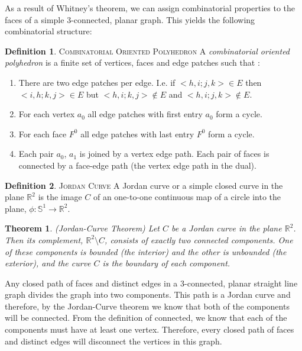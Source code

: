\documentclass[11pt]{article}
\newcommand{\R}{\mathbb{R}}
\newtheorem{theorem}{Theorem}[section]
\theoremstyle{definition}
\newtheorem{definition}{Definition}[section]
\begin{document}
	As a result of Whitney's theorem, we can assign combinatorial properties to the faces of a simple 3-connected, planar graph. 
	This yields the following combinatorial structure:
	\theoremstyle{definition}
	\begin{definition}{\textsc{Combinatorial Oriented Polyhedron}}
		A \emph{combinatorial oriented polyhedron} is a finite set of vertices, faces and edge patches such that \cite{mccProof}:
		\begin{enumerate}
			\item There are two edge patches per edge. I.e. if $<h,i;j,k> \in E$ then $<i,h;k,j> \in E$ but $<h,i;k,j> \not\in E$ and $<h,i;j,k> \not\in E$.
			\item For each vertex $a_0$ all edge patches with first entry $a_0$ form a cycle. 
			\item For each face $F^0$ all edge patches with last entry $F^0$ form a cycle.
			\item Each pair $a_0$, $a_1$ is joined by a vertex edge path. Each pair of faces is connected by a face-edge path (the vertex edge path in the dual). 
		\end{enumerate}
	\end{definition}

	\theoremstyle{definition}
	\begin{definition}{\textsc{Jordan Curve}}
		A Jordan curve or a simple closed curve in the plane $\R^2$ is the image $C$ of an one-to-one continuous map of a circle into the plane, $\phi : \mathbb{S}^1 \rightarrow \R^2$. 
	\end{definition}
	
	\begin{theorem}{(Jordan-Curve Theorem)}
		Let $C$ be a Jordan curve in the plane $\R^2$. 
		Then its complement, $\R^2 \setminus C$, consists of exactly two connected components. 
		One of these components is bounded (the interior) and the other is unbounded (the exterior), and the curve $C$ is the boundary of each component.
	\end{theorem}

	Any closed path of faces and distinct edges in a 3-connected, planar straight line graph divides the graph into two components.
	This path is a Jordan curve and therefore, by the Jordan-Curve theorem we know that both of the components will be connected. 
	From the definition of connected, we know that each of the components must have at least one vertex.
	Therefore, every closed path of faces and distinct edges will disconnect the vertices in this graph.
	
\end{document}
